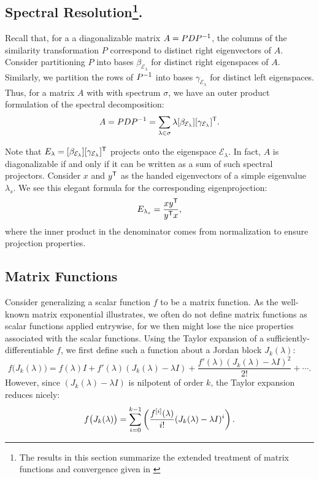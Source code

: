 \documentclass[../exploring-pagerank.tex]{subfiles}
\begin{document}
    \subsection{Spectral Resolution\protect\footnote{The results in this section summarize the extended treatment of matrix functions and convergence given in \cite{meyerMatrixAnalysisApplied2000}}.}
    Recall that, for a a diagonalizable matrix $A=PDP^{-1}$, the columns of the similarity transformation $P$ correspond to distinct right eigenvectors of $A$. Consider partitioning $P$ into bases $\beta_{\mathcal{E}_\lambda}$ for distinct right eigenspaces of $A$. Similarly, we partition the rows of $P^{-1}$ into bases $\gamma_{\mathcal{E}_\lambda}$ for distinct left eigenspaces. Thus, for a matrix $A$ with with spectrum $\sigma$, we have an outer product formulation of the spectral decomposition:
    \begin{equation}
        \label{eqn:spectral_decomposition}
        A = PDP^{-1} = \sum_{\lambda\in\sigma}{\lambda [\beta_{\mathcal{E}_\lambda}][\gamma_{\mathcal{E}_\lambda}]^{\mathsf{T}}}.
    \end{equation}

    Note that $E_\lambda = [\beta_{\mathcal{E}_\lambda}][\gamma_{\mathcal{E}_\lambda}]^{\mathsf{T}}$ projects onto the eigenspace $\mathcal{E}_\lambda$. In fact, $A$ is diagonalizable if and only if it can be written as a sum of such spectral projectors. Consider $x$ and $y^{\mathsf{T}}$ as the handed eigenvectors of a simple eigenvalue $\lambda_s$. We see this elegant formula for the corresponding eigenprojection:
    \begin{equation}
        \label{eqn:simple_eigenprojection}
        E_{\lambda_s} = \frac{x y^{\mathsf{T}}}{y^{\mathsf{T}} x},
    \end{equation}
    where the inner product in the denominator comes from normalization to ensure projection properties.

    \subsection{Matrix Functions}
	Consider generalizing a scalar function $f$ to be a matrix function. As the well-known matrix exponential illustrates, we often do not define matrix functions as scalar functions applied entrywise, for we then might lose the nice properties associated with the scalar functions. Using the Taylor expansion of a sufficiently-differentiable $f$, we first define such a function about a Jordan block $J_k(\lambda)$:
	\begin{equation*}
		f\big( J_k(\lambda) \big)=f(\lambda)I + f'(\lambda)(J_k(\lambda) - \lambda I) + \frac{f'(\lambda)(J_k(\lambda) - \lambda I)^2}{2!} + \cdots.
	\end{equation*}
	However, since $(J_k(\lambda) - \lambda I)$ is nilpotent of order $k$, the Taylor expansion reduces nicely:
	\begin{equation}
	    \label{eqn:f_jordan_block}
		f\big( J_k(\lambda) \big) = \sum_{i=0}^{k - 1}\left( \frac{f^{[i]}(\lambda)}{i!} (J_k(\lambda) - \lambda I)^i \right).
	\end{equation}
\end{document}

